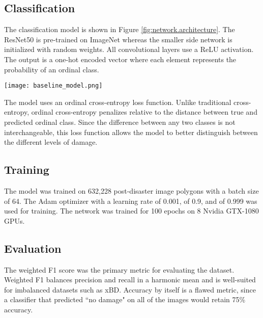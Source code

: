 \documentclass[10pt,twocolumn,letterpaper]{article}
\begin{document}
\subsection{Classification}
The classification model is shown in Figure \ref{fig:network.architecture}. The ResNet50 is pre-trained on ImageNet \cite{dengImageNetLargeScaleHierarchical} whereas the smaller side network is initialized with random weights.
All convolutional layers use a ReLU activation.
The output is a one-hot encoded vector where each element represents the probability of an ordinal class.

\begin{figure*}[!h]
	\begin{center}
		\texttt{[image: baseline\_model.png]}
	\end{center}
	\caption{Architecture of the baseline classification model. The input is fed into a pre-trained ResNet 50 as well as a shallow CNN. The outputs of each stream are concatenated and passed into dense layers for classification.}
	\label{fig:network.architecture}
\end{figure*}

The model uses an ordinal cross-entropy loss function.
Unlike traditional cross-entropy, ordinal cross-entropy penalizes relative to the distance between true and predicted ordinal class.
Since the difference between any two classes is not interchangeable, this loss function allows the model to better distinguish between the different levels of damage.

\subsection{Training}
The model was trained on 632,228 post-disaster image polygons with a batch size of 64.
The Adam optimizer with a learning rate of 0.001,  of 0.9, and  of 0.999 was used for training.
The network was trained for 100 epochs on 8 Nvidia GTX-1080 GPUs.

\subsection{Evaluation}
The weighted F1 score was the primary metric for evaluating the dataset.
Weighted F1 balances precision and recall in a harmonic mean and is well-suited for imbalanced datasets such as xBD.
Accuracy by itself is a flawed metric, since a classifier that predicted ``no damage" on all of the images would retain 75\% accuracy.
\end{document}
